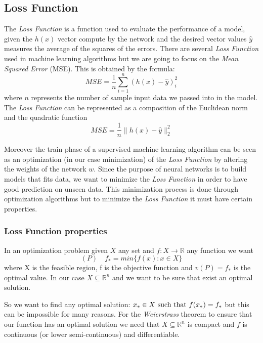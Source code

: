 \subsection{Loss Function}
\label{Loss:Mse}
The \textit{Loss Function} is a function used to evaluate the performance of a model, given the $h(x)$ vector compute by the network and the desired vector values $\widehat{y}$ measures the average of the squares of the errors. There are several \textit{Loss Function} used in machine learning algorithms but we are going to focus on the \textit{Mean Squared Error} (MSE). This is obtained by the formula: 	
\begin{equation}
MSE = \frac{1}{n} \sum_{i=1}^n (h(x) - \widehat{y})_{i}^2
\end{equation}
where $n$ represents the number of sample input data we passed into in the model. 
The \textit{Loss Function} can be represented as a composition of the Euclidean norm and the quadratic function
\begin{equation}
MSE = \frac{1}{n} \parallel h(x) - \widehat{y} \parallel_{2}^2  
\end{equation}

Moreover the train phase of a supervised machine learning algorithm can be seen as an optimization (in our case minimization) of the \textit{Loss Function} by altering the weights of the network $w$.   
Since the purpose of neural networks is to build models that fits data, we want to minimize the \textit{Loss Function} in order to have good prediction on unseen data. This minimization process is done through optimization algorithms but to minimize the \textit{Loss Function} it must have certain properties.	

\subsubsection{Loss Function properties}
\label{LF:Properties}
In an optimization problem given $X$ any set and $f: X \rightarrow \mathbb{R}$ any function we want
\begin{equation}
(P) \quad f_{*} = min \{f(x) : x \in X\}
\end{equation}
where X is the feasible region, f is the objective function and $v(P) = f_{*}$ is the optimal value. In our case $X \subseteq \mathbb{R}^{n}$ and we want to be sure that exist an optimal solution.

So we want to find any optimal solution: $x_{*} \in X  \textnormal{ such that } f(x_{*}) = f_{*}$ but this can be impossible for many reasons. For the \textit{Weierstrass} theorem to ensure that our function has an optimal solution we need that $X \subseteq \mathbb{R}^{n}$ is compact and $f$ is continuous (or lower semi-continuous) and differentiable. 

